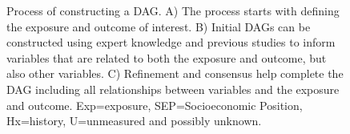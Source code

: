 \documentclass{article}
\begin{document}
\begin{figure}[H]
\caption{Process of constructing a DAG. A) The process starts with defining the exposure and outcome of interest. B) Initial DAGs can be constructed using expert knowledge and previous studies to inform variables that are related to both the exposure and outcome, but also other variables. C) Refinement and consensus help complete the DAG including all relationships between variables and the exposure and outcome. Exp=exposure, SEP=Socioeconomic Position, Hx=history, U=unmeasured and possibly unknown.}
\end{figure}
\end{document}
